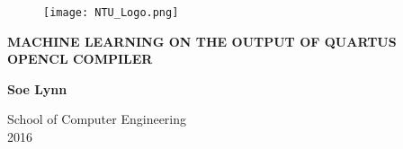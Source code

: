 \thispagestyle{empty}

\begin{center}

\begin{figure}[h]
    \centering
    \texttt{[image: NTU\_Logo.png]}
\end{figure}

\vspace{5.0cm}

\textbf{\Large \MakeUppercase{Machine Learning on the output of quartus OpenCL compiler}}

\vspace{\fill}

\textbf{Soe Lynn}

\vspace{3.0cm}

School of Computer Engineering \\
2016

\end{center}
